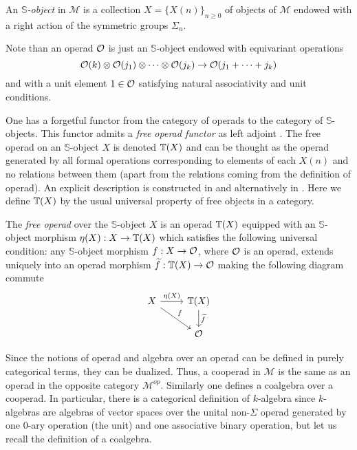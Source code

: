 \documentclass[TFM.tex]{subfiles}
\begin{document}
\begin{defi}
 An \emph{$\mathbb{S}$-object} in $\mathscr{M}$ is a collection $X=\{X(n)\}_{n\geq 0}$ of objects of $\mathscr{M}$ endowed with a right action of the symmetric groups $\Sigma_n$.
\end{defi}

Note than an operad ${\mathcal O}$ is just an $\mathbb{S}$-object endowed with
equivariant operations
\[{\mathcal O}(k)\otimes{\mathcal O}(j_1)\otimes\cdots\otimes{\mathcal O}(j_k)\to {\mathcal O}(j_1+\cdots+j_k)\]
and with a unit element $1 \in{\mathcal O}$ satisfying natural associativity and unit conditions.




One has a forgetful functor from the category of operads to the category of $\mathbb{S}$-objects. This functor admits a \emph{free operad functor} as left adjoint \cite{GJ}. The free operad on an $\mathbb{S}$-object $X$ is denoted $\mathbb{T}(X)$ and can be thought as the operad generated by all formal operations corresponding to elements of each $X(n)$ and no relations between them (apart from the relations coming from the definition of operad). An explicit description is constructed in \cite{GJ} and alternatively in \cite{AlgebraicOperads}. Here we define $\mathbb{T}(X)$ by the usual universal property of free objects in a category. 

\begin{defi}
The \emph{free operad} over the $\mathbb{S}$-object $X$ is an operad $\mathbb{T}(X)$ equipped with an $\mathbb{S}$-object morphism $\eta(X):X\to\mathbb{T}(X)$ which satisfies the following universal condition: any $\mathbb{S}$-object morphism $f:X\to {\mathcal O}$, where ${\mathcal O}$ is an operad, extends uniquely into an operad morphism $\widetilde{f}:\mathbb{T}(X)\to{\mathcal O}$ making the following diagram commute
\[
\begin{tikzcd}
X\arrow[r, "\eta(X)"]\arrow[dr,"f"] & \T(X)\arrow[d, "\widetilde{f}"]\\
& \OO
\end{tikzcd}
\] 
\end{defi}

Since the notions of operad and algebra over an operad can be defined in purely categorical terms, they can be dualized. Thus, a cooperad in $\mathscr{M}$ is the same as an operad in the opposite category $\mathscr{M}^{op}$. Similarly one defines a coalgebra over a cooperad. In particular, there is a categorical definition of $k$-algebra since $k$-algebras are algebras of vector spaces over the unital non-$\Sigma$ operad generated by one 0-ary operation (the unit) and one associative binary operation, but let us recall the definition of a coalgebra.
\end{document}
